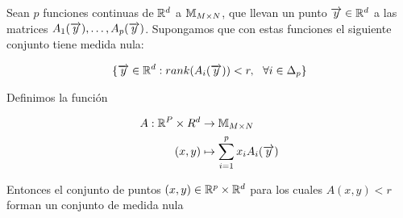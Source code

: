 \begin{lema} \label{lema:segundo_lema}
    Sean $p$ funciones continuas de $\mathbb{R}^d$ a $\mathbb{M}_{M \times N}$, que llevan un punto $\overrightarrow{y} \in \mathbb{R}^d$ a las matrices $A_1(\overrightarrow{y}), \ldots, A_p(\overrightarrow{y})$. Supongamos que con estas funciones el siguiente conjunto tiene medida nula:

    \begin{equation}
        \{ \overrightarrow{y} \in \mathbb{R}^d : rank(A_i(\overrightarrow{y})) < r, \ \  \forall i \in \Delta_{p} \}
    \end{equation}

    Definimos la función

    \begin{equation}
        \begin{split}
            A: \mathbb{R}^P \times R^d &\to \mathbb{M}_{M \times N} \\
            (x, y) &\mapsto \sum_{i = 1}^p x_i A_i(\overrightarrow{y})
        \end{split}
    \end{equation}

    Entonces el conjunto de puntos $(x, y) \in \mathbb{R}^p \times \mathbb{R}^d$ para los cuales $A(x, y) < r$ forman un conjunto de medida nula
\end{lema}

